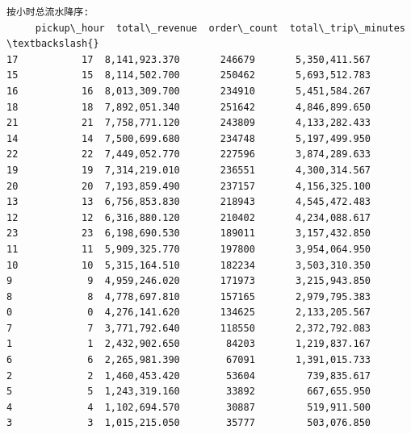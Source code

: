 \documentclass[11pt]{article}
\begin{document}
    \begin{Verbatim}[commandchars=\\\{\}]
按小时总流水降序:
     pickup\_hour  total\_revenue  order\_count  total\_trip\_minutes  \textbackslash{}
17           17  8,141,923.370       246679       5,350,411.567
15           15  8,114,502.700       250462       5,693,512.783
16           16  8,013,309.700       234910       5,451,584.267
18           18  7,892,051.340       251642       4,846,899.650
21           21  7,758,771.120       243809       4,133,282.433
14           14  7,500,699.680       234748       5,197,499.950
22           22  7,449,052.770       227596       3,874,289.633
19           19  7,314,219.010       236551       4,300,314.567
20           20  7,193,859.490       237157       4,156,325.100
13           13  6,756,853.830       218943       4,545,472.483
12           12  6,316,880.120       210402       4,234,088.617
23           23  6,198,690.530       189011       3,157,432.850
11           11  5,909,325.770       197800       3,954,064.950
10           10  5,315,164.510       182234       3,503,310.350
9             9  4,959,246.020       171973       3,215,943.850
8             8  4,778,697.810       157165       2,979,795.383
0             0  4,276,141.620       134625       2,133,205.567
7             7  3,771,792.640       118550       2,372,792.083
1             1  2,432,902.650        84203       1,219,837.167
6             6  2,265,981.390        67091       1,391,015.733
2             2  1,460,453.420        53604         739,835.617
5             5  1,243,319.160        33892         667,655.950
4             4  1,102,694.570        30887         519,911.500
3             3  1,015,215.050        35777         503,076.850


\end{Verbatim}
\end{document}

